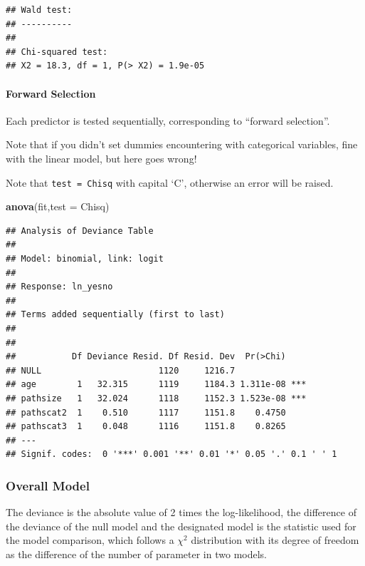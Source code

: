 \documentclass[
]{ctexart}
\newenvironment{Shaded}{\begin{snugshade}}{\end{snugshade}}
\newcommand{\AttributeTok}[1]{\textcolor[rgb]{0.13,0.29,0.53}{#1}}
\newcommand{\FunctionTok}[1]{\textcolor[rgb]{0.13,0.29,0.53}{\textbf{#1}}}
\newcommand{\NormalTok}[1]{#1}
\newcommand{\StringTok}[1]{\textcolor[rgb]{0.31,0.60,0.02}{#1}}
\begin{document}
\begin{verbatim}
## Wald test:
## ----------
## 
## Chi-squared test:
## X2 = 18.3, df = 1, P(> X2) = 1.9e-05
\end{verbatim}

\hypertarget{forward-selection}{%
\paragraph{Forward Selection}\label{forward-selection}}

Each predictor is tested sequentially, corresponding to ``forward
selection''.

Note that if you didn't set dummies encountering with categorical
variables, fine with the linear model, but here goes wrong!

Note that \texttt{test\ =\ \textquotesingle{}Chisq\textquotesingle{}}
with capital `C', otherwise an error will be raised.

\begin{Shaded}
\begin{Highlighting}[]
\FunctionTok{anova}\NormalTok{(fit,}\AttributeTok{test =} \StringTok{\textquotesingle{}Chisq\textquotesingle{}}\NormalTok{)}
\end{Highlighting}
\end{Shaded}

\begin{verbatim}
## Analysis of Deviance Table
## 
## Model: binomial, link: logit
## 
## Response: ln_yesno
## 
## Terms added sequentially (first to last)
## 
## 
##           Df Deviance Resid. Df Resid. Dev  Pr(>Chi)    
## NULL                       1120     1216.7              
## age        1   32.315      1119     1184.3 1.311e-08 ***
## pathsize   1   32.024      1118     1152.3 1.523e-08 ***
## pathscat2  1    0.510      1117     1151.8    0.4750    
## pathscat3  1    0.048      1116     1151.8    0.8265    
## ---
## Signif. codes:  0 '***' 0.001 '**' 0.01 '*' 0.05 '.' 0.1 ' ' 1
\end{verbatim}

\hypertarget{overall-model}{%
\subsubsection{Overall Model}\label{overall-model}}

The deviance is the absolute value of 2 times the log-likelihood, the
difference of the deviance of the null model and the designated model is
the statistic used for the model comparison, which follows a \(\chi^2\)
distribution with its degree of freedom as the difference of the number
of parameter in two models.
\end{document}
